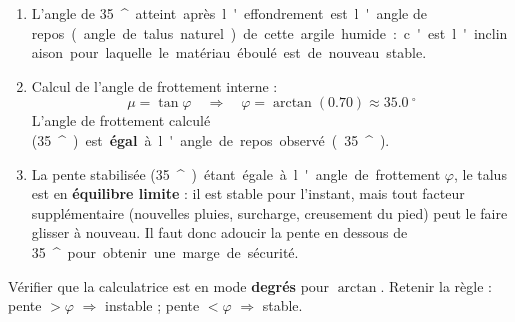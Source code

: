 \documentclass[11pt]{article}
\providecommand{\degree}{^{\circ}}
\newcommand{\cle}[1]{{\popxbold\color{popdark}#1}}
\begin{document}
\begin{corrige}
\tcblower
\begin{enumerate}
\item L'angle de \SI{35}{\degree} atteint après l'effondrement est l'\cle{angle de repos} (angle de talus naturel) de cette argile humide : c'est l'inclinaison pour laquelle le matériau éboulé est de nouveau stable.
\item Calcul de l'angle de frottement interne :
\[ \mu = \tan\varphi \quad \Longrightarrow \quad \varphi = \arctan(0.70) \approx \SI{35.0}{\degree} \]
L'angle de frottement calculé (\SI{35}{\degree}) est \textbf{égal} à l'angle de repos observé (\SI{35}{\degree}).
\item La pente stabilisée (\SI{35}{\degree}) étant égale à l'angle de frottement $\varphi$, le talus est en \textbf{équilibre limite} : il est stable pour l'instant, mais tout facteur supplémentaire (nouvelles pluies, surcharge, creusement du pied) peut le faire glisser à nouveau. Il faut donc adoucir la pente en dessous de \SI{35}{\degree} pour obtenir une marge de sécurité.
\end{enumerate}
\end{corrige}
\begin{attention}
Vérifier que la calculatrice est en mode \textbf{degrés} pour $\arctan$. Retenir la règle : pente $> \varphi$ $\Rightarrow$ instable ; pente $< \varphi$ $\Rightarrow$ stable.
\end{attention}
\end{document}
